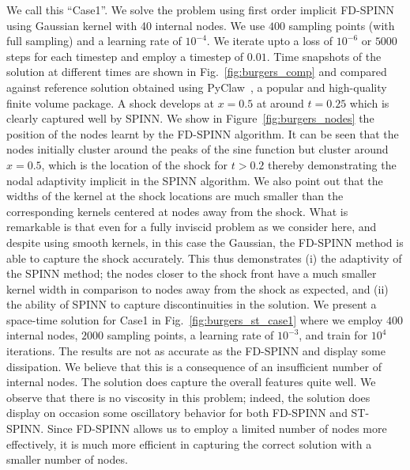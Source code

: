 \documentclass[12pt]{article}
\newcommand{\rb}[1]{#1}
\newcommand{\new}[1]{#1}
\begin{document}
\rb{We call this ``Case1''.} We solve the problem using first order implicit FD-SPINN using Gaussian kernel with 40 internal nodes. \rb{We use $400$ sampling points (with full sampling) and a learning rate of $10^{-4}$. We iterate upto a loss of $10^{-6}$ or $5000$ steps for each timestep and employ a timestep of $0.01$.}  Time snapshots of the solution at different times are shown in Fig.~\ref{fig:burgers_comp} and compared against reference solution obtained using PyClaw~\cite{pyclaw}, a popular and high-quality finite volume package. A shock develops at $x=0.5$ at around $t=0.25$ which is clearly captured well by SPINN. We show in Figure~\ref{fig:burgers_nodes} the position of the nodes learnt by the FD-SPINN algorithm.  It can be seen that the nodes initially cluster around the peaks of the sine function but cluster around $x=0.5$, which is the location of the shock for $t> 0.2$ thereby demonstrating the nodal adaptivity implicit in the SPINN algorithm. We also point out that the widths of the kernel at the shock locations are much smaller than the corresponding kernels centered at nodes away from the shock. What is remarkable is that \new{even for a fully inviscid problem as we consider here}, and despite using smooth kernels, in this case the Gaussian, the FD-SPINN method is able to capture the shock accurately. This thus demonstrates (i) the adaptivity of the SPINN method; the nodes closer to the shock front have a much smaller kernel width in comparison to nodes away from the shock as expected, and (ii) the ability of SPINN to capture discontinuities in the solution. \rb{We present a space-time solution for Case1 in Fig.~\ref{fig:burgers_st_case1} where we employ $400$ internal nodes, $2000$ sampling points, a learning rate of $10^{-3}$, and train for $10^4$ iterations.  The results are not as accurate as the FD-SPINN and display some dissipation.  We believe that this is a consequence of an insufficient number of internal nodes.  The solution does capture the overall features quite well.  We observe that there is no viscosity in this problem; indeed, the solution does display on occasion some oscillatory behavior for both FD-SPINN and ST-SPINN.  Since FD-SPINN allows us to employ a limited number of nodes more effectively, it is much more efficient in capturing the correct solution with a smaller number of nodes.}
\end{document}
